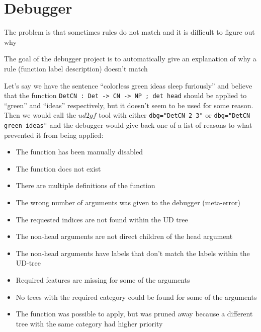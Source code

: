\chapter{Debugger}

The problem is that sometimes rules do not match and it is difficult to figure out why

The goal of the debugger project is to automatically give an explanation of why a rule (function label description) doesn't match




Let's say we have the sentence ``colorless green ideas sleep furiously'' and believe that the function \verb|DetCN : Det -> CN -> NP ; det head| should be applied to ``green'' and ``ideas'' respectively, but it doesn't seem to be
used for some reason. Then we would call the $ud2gf$ tool with either \verb|dbg="DetCN 2 3"| or \verb|dbg="DetCN green ideas"| and the debugger would give back one of a list of reasons to what prevented it from being applied:

\begin{itemize}
    \item The function has been manually disabled
    \item The function does not exist
    \item There are multiple definitions of the function
    \item The wrong number of arguments was given to the debugger (meta-error)
    \item The requested indices are not found within the UD tree
    \item The non-head arguments are not direct children of the head argument
    \item The non-head arguments have labels that don't match the labels within the UD-tree
    \item Required features are missing for some of the arguments
    \item No trees with the required category could be found for some of the arguments
    \item The function was possible to apply, but was pruned away because a different tree with the same category had higher priority
\end{itemize}


